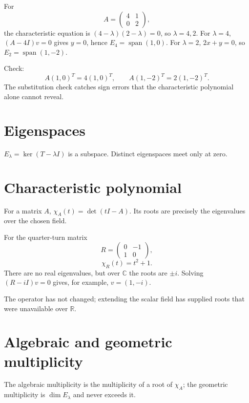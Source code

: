 \begin{example}\label{ex:i09-expand-01}
For
\[
A=\begin{pmatrix}4&1\\0&2\end{pmatrix},
\]
the characteristic equation is
\((4-\lambda)(2-\lambda)=0\), so \(\lambda=4,2\).
For \(\lambda=4\), \((A-4I)v=0\) gives \(y=0\), hence
\(E_4=\operatorname{span}(1,0)\). For \(\lambda=2\),
\(2x+y=0\), so \(E_2=\operatorname{span}(1,-2)\).

Check:
\[
A(1,0)^T=4(1,0)^T,\qquad
A(1,-2)^T=2(1,-2)^T.
\]
The substitution check catches sign errors that the characteristic polynomial
alone cannot reveal.
\end{example}
\section{Eigenspaces}
$E_\lambda=\ker(T-\lambda I)$ is a subspace. Distinct eigenspaces meet only at zero.

\section{Characteristic polynomial}
For a matrix $A$, $\chi_A(t)=\det(tI-A)$. Its roots are precisely the eigenvalues over the chosen field.


\begin{example}\label{ex:i09-expand-02}
For the quarter-turn matrix
\[
R=\begin{pmatrix}0&-1\\1&0\end{pmatrix},
\]
\[
\chi_R(t)=t^2+1.
\]
There are no real eigenvalues, but over \(\mathbb C\) the roots are
\(\pm i\). Solving \((R-iI)v=0\) gives, for example,
\(v=(1,-i)\).

The operator has not changed; extending the scalar field has supplied roots
that were unavailable over \(\mathbb R\).
\end{example}
\section{Algebraic and geometric multiplicity}
The algebraic multiplicity is the multiplicity of a root of $\chi_A$; the geometric multiplicity is $\dim E_\lambda$ and never exceeds it.


